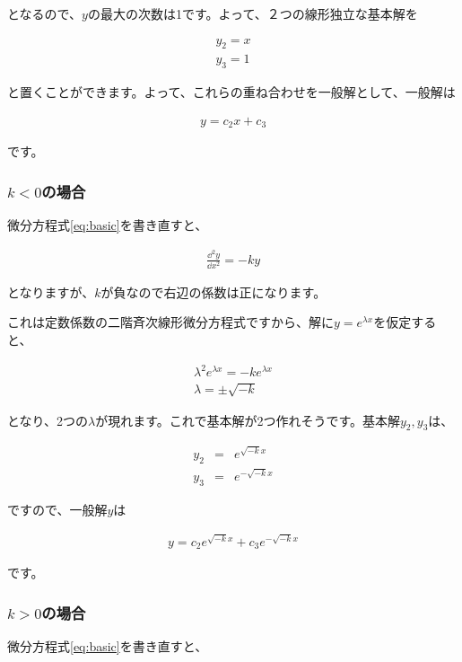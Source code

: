 \noindent
となるので、$y$の最大の次数は1です。よって、２つの線形独立な基本解を

\begin{eqnarray}
    y_2=x \\
    y_3=1
\end{eqnarray}

\noindent
と置くことができます。よって、これらの重ね合わせを一般解として、一般解は

\begin{eqnarray}
    y=c_2x+c_3
\end{eqnarray}

\noindent
です。

\subsubsection{$k<0$の場合}

微分方程式\ref{eq:basic}を書き直すと、

\begin{eqnarray}
    \frac{\dd^2y}{\dd x^2}=-ky
\end{eqnarray}

\noindent
となりますが、$k$が負なので右辺の係数は正になります。

これは定数係数の二階斉次線形微分方程式ですから、解に$y=e^{\lambda x}$を仮定すると、

\begin{eqnarray}
    \lambda^2e^{\lambda x}=-ke^{\lambda x} \\
    \lambda=\pm \sqrt{-k}
\end{eqnarray}

\noindent
となり、2つの$\lambda$が現れます。これで基本解が2つ作れそうです。基本解$y_2,y_3$は、

\begin{eqnarray}
    y_2&=&e^{\sqrt{-k}x} \\
    y_3&=&e^{-\sqrt{-k}x}
\end{eqnarray}

\noindent
ですので、一般解$y$は

\begin{eqnarray}
    y=c_2e^{\sqrt{-k}x}+c_3e^{-\sqrt{-k}x}
\end{eqnarray}

\noindent
です。

\subsubsection{$k>0$の場合}
微分方程式\ref{eq:basic}を書き直すと、

